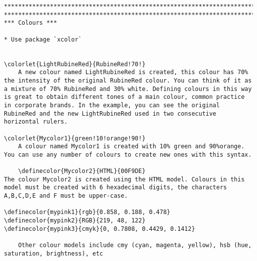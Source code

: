 \documentclass{article}
\begin{document}
\begin{lstlisting}[language={[LaTeX]TeX}, caption={Alternative short names.}]
*********************************************************************************************
*********************************************************************************************
*** Colours ***

* Use package `xcolor`


\colorlet{LightRubineRed}{RubineRed!70!}
	A new colour named LightRubineRed is created, this colour has 70% the intensity of the original RubineRed colour. You can think of it as a mixture of 70% RubineRed and 30% white. Defining colours in this way is great to obtain different tones of a main colour, common practice in corporate brands. In the example, you can see the original RubineRed and the new LightRubineRed used in two consecutive horizontal rulers.

\colorlet{Mycolor1}{green!10!orange!90!}
	A colour named Mycolor1 is created with 10% green and 90%orange. You can use any number of colours to create new ones with this syntax.

	\definecolor{Mycolor2}{HTML}{00F9DE}
The colour Mycolor2 is created using the HTML model. Colours in this model must be created with 6 hexadecimal digits, the characters A,B,C,D,E and F must be upper-case.

\definecolor{mypink1}{rgb}{0.858, 0.188, 0.478}
\definecolor{mypink2}{RGB}{219, 48, 122}
\definecolor{mypink3}{cmyk}{0, 0.7808, 0.4429, 0.1412}
	
	Other colour models include cmy (cyan, magenta, yellow), hsb (hue, saturation, brightness), etc



\end{lstlisting}







\clearpage
\singlespacing


\end{document}
